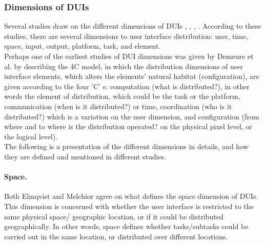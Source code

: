 \subsubsection{Dimensions of DUIs}
Several studies draw on the different dimensions of DUIs
\cite{melchior2011distributed}, \cite{demeure20084c},
\cite{elmqvist2011distributed}, \cite{vanderdonckt2010distributed}. According to
these studies, there are several dimensions to user interface distribution:
user, time, space, input, output, platform, task, and element.\\ 
Perhaps one of the earliest studies of DUI dimensions was
given by Demeure et al. by describing the 4C model, in
which the distribution dimensions of user interface elements, which alters the
elements' natural habitat (configuration), are given according to the four 'C'
s: computation (what is distributed?), in other words the element of
distribution, which could be the task or the platform, communication (when is it distributed?)
or time, coordination (who is it distributed?) which is a variation on the user
dimension, and configuration (from where and to where is the distribution operated? on the physical pixel level, or
the logical level)\cite{demeure20084c}.\\

The following is a presentation of the different dimensions in details, and
how they are defined and mentioned in different studies.
\paragraph{Space.}  Both Elmqvist \cite{elmqvist2011distributed} and Melchior
\cite{melchior2011distributed} agree on what defines the space  dimension of
DUIs. This dimension is concerned with whether the user interface is
restricted to the same physical space/ geographic location, or if it could be
distributed geographically. In other words, space defines whether tasks/subtasks
could be carried out in the same location, or distributed over different
locations. 

